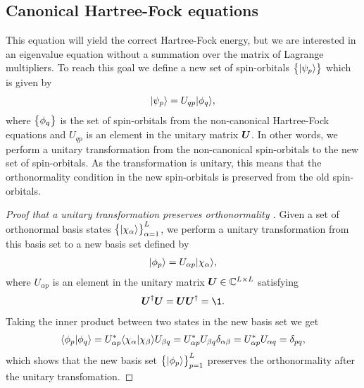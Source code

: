         \subsection{Canonical Hartree-Fock equations}
            This equation will yield the correct Hartree-Fock energy, but we are
            interested in an eigenvalue equation without a summation over the matrix
            of Lagrange multipliers.
            To reach this goal we define a new set of spin-orbitals
            $\left\{ | \psi_p \rangle \right\}$ which is given by
            \begin{align}
                | \psi_p \rangle = U_{qp}| \phi_q \rangle,
            \end{align}
            where $\left\{ \phi_q \right\}$ is the set of spin-orbitals from the non-canonical
            Hartree-Fock equations and $U_{qp}$ is an element in the unitary matrix
            $\boldsymbol{U}$.
            In other words, we perform a unitary transformation from the
            non-canonical spin-orbitals to the new set of spin-orbitals.
            As the transformation is unitary, this means that the orthonormality
            condition in the new spin-orbitals is preserved from the old
            spin-orbitals.
            \begin{proof}[%
                    Proof that a unitary transformation preserves orthonormality%
            ]
                Given a set of orthonormal basis states
                $\left\{ | \chi_{\alpha} \rangle \right\}_{\alpha = 1}^{L}$,
                we perform a unitary transformation from this basis set to a new
                basis set defined by
                \begin{align}
                    | \phi_p \rangle = U_{\alpha p}| \chi_{\alpha} \rangle,
                \end{align}
                where $U_{\alpha p}$ is an element in the unitary matrix $\boldsymbol{U} \in
                \mathbb{C}^{L \times L}$ satisfying
                \begin{align}
                    \vfg{U}^{\dagger}\vfg{U} = \vfg{U}\vfg{U}^{\dagger} = \1.
                \end{align}
                Taking the inner product between two states in the new basis set we
                get
                \begin{align}
                    \langle \phi_p | \phi_q \rangle
                    = U^{*}_{\alpha p}
                    \langle \chi_{\alpha} | \chi_{\beta} \rangle
                    U_{\beta q}
                    = U^{*}_{\alpha p} U_{\beta q} \delta_{\alpha \beta}
                    = U^{*}_{\alpha p} U_{\alpha q}
                    = \delta_{pq},
                \end{align}
                which shows that the new basis set $\left\{ | \phi_p \rangle \right\}_{p = 1}^L$
                preserves the orthonormality after the unitary transfomation.
            \end{proof}
